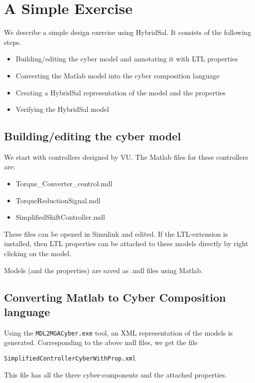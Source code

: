 \documentclass{llncs}
\begin{document}
\section{A Simple Exercise}

We describe a simple design exercise using
HybridSal.  It consists of the following steps.
\begin{itemize}
  \item Building/editing the cyber model and
    annotating it with LTL properties
  \item Converting the Matlab model into the
    cyber composition language
  \item Creating a HybridSal representation of
    the model and the properties
  \item Verifying the HybridSal model
\end{itemize}

\subsection{Building/editing the cyber model}
We start with controllers designed by VU.
The Matlab files for these controllers are:
\begin{itemize}
  \item Torque\_Converter\_control.mdl
  \item TorqueReductionSignal.mdl
  \item SimplifiedShiftController.mdl
\end{itemize}

These files can be opened in Simulink and edited.
If the LTL-extension is installed, then LTL properties
can be attached to these models directly by right clicking
on the model.

Models (and the properties) are saved as .mdl files
using Matlab.

\subsection{Converting Matlab to Cyber Composition language}

Using the {\tt{MDL2MGACyber.exe}} tool, an XML representation
of the models is generated.
Corresponding to the above mdl files,
we get the file 

\begin{center}
   {\tt{SimplifiedControllerCyberWithProp.xml}}
\end{center}

This file has all the three cyber-components and 
the attached properties.
\end{document}
